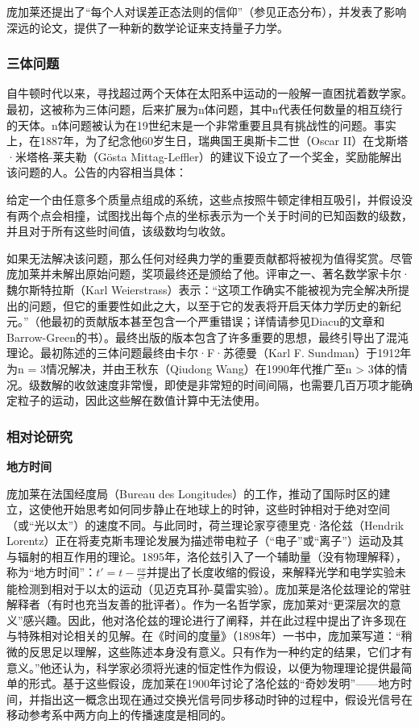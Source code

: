 庞加莱还提出了“每个人对误差正态法则的信仰”（参见正态分布），并发表了影响深远的论文，提供了一种新的数学论证来支持量子力学。
\subsubsection{三体问题}  
自牛顿时代以来，寻找超过两个天体在太阳系中运动的一般解一直困扰着数学家。最初，这被称为三体问题，后来扩展为n体问题，其中n代表任何数量的相互绕行的天体。n体问题被认为在19世纪末是一个非常重要且具有挑战性的问题。事实上，在1887年，为了纪念他60岁生日，瑞典国王奥斯卡二世（Oscar II）在戈斯塔·米塔格-莱夫勒（Gösta Mittag-Leffler）的建议下设立了一个奖金，奖励能解出该问题的人。公告的内容相当具体：

给定一个由任意多个质量点组成的系统，这些点按照牛顿定律相互吸引，并假设没有两个点会相撞，试图找出每个点的坐标表示为一个关于时间的已知函数的级数，并且对于所有这些时间值，该级数均匀收敛。

如果无法解决该问题，那么任何对经典力学的重要贡献都将被视为值得奖赏。尽管庞加莱并未解出原始问题，奖项最终还是颁给了他。评审之一、著名数学家卡尔·魏尔斯特拉斯（Karl Weierstrass）表示：“这项工作确实不能被视为完全解决所提出的问题，但它的重要性如此之大，以至于它的发表将开启天体力学历史的新纪元。”（他最初的贡献版本甚至包含一个严重错误；详情请参见Diacu的文章和Barrow-Green的书）。最终出版的版本包含了许多重要的思想，最终引导出了混沌理论。最初陈述的三体问题最终由卡尔·F·苏德曼（Karl F. Sundman）于1912年为n = 3情况解决，并由王秋东（Qiudong Wang）在1990年代推广至n > 3体的情况。级数解的收敛速度非常慢，即使是非常短的时间间隔，也需要几百万项才能确定粒子的运动，因此这些解在数值计算中无法使用。
\subsubsection{相对论研究}
\textbf{地方时间}

庞加莱在法国经度局（Bureau des Longitudes）的工作，推动了国际时区的建立，这使他开始思考如何同步静止在地球上的时钟，这些时钟相对于绝对空间（或“光以太”）的速度不同。与此同时，荷兰理论家亨德里克·洛伦兹（Hendrik Lorentz）正在将麦克斯韦理论发展为描述带电粒子（“电子”或“离子”）运动及其与辐射的相互作用的理论。1895年，洛伦兹引入了一个辅助量（没有物理解释），称为“地方时间”：\(t' = t - \frac{vx}{c^2}\)并提出了长度收缩的假设，来解释光学和电学实验未能检测到相对于以太的运动（见迈克耳孙-莫雷实验）。庞加莱是洛伦兹理论的常驻解释者（有时也充当友善的批评者）。作为一名哲学家，庞加莱对“更深层次的意义”感兴趣。因此，他对洛伦兹的理论进行了阐释，并在此过程中提出了许多现在与特殊相对论相关的见解。在《时间的度量》（1898年）一书中，庞加莱写道：“稍微的反思足以理解，这些陈述本身没有意义。只有作为一种约定的结果，它们才有意义。”他还认为，科学家必须将光速的恒定性作为假设，以便为物理理论提供最简单的形式。基于这些假设，庞加莱在1900年讨论了洛伦兹的“奇妙发明”——地方时间，并指出这一概念出现在通过交换光信号同步移动时钟的过程中，假设光信号在移动参考系中两方向上的传播速度是相同的。

